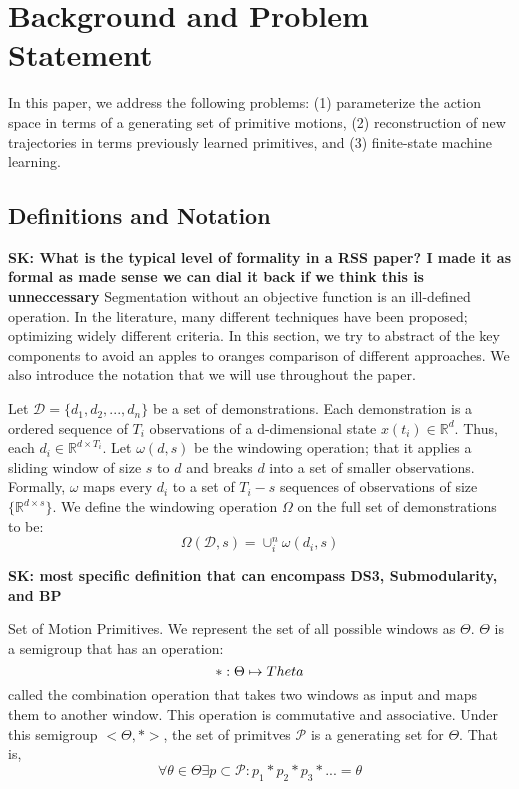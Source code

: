\section{Background and Problem Statement}
In this paper, we address the following problems: (1) parameterize the action space in terms of a generating set of primitive motions, (2) reconstruction of new trajectories in terms previously learned primitives, and (3) finite-state machine learning.
\subsection{Definitions and Notation}
\textbf{SK: What is the typical level of formality in a RSS paper? I made it as formal as made sense we can dial it back if we think this is unneccessary}
Segmentation without an objective function is an ill-defined operation. 
In the literature, many different techniques have been proposed; optimizing widely different criteria.
In this section, we try to abstract of the key components to avoid an apples to oranges comparison of different approaches.
We also introduce the notation that we will use throughout the paper.

Let $\mathcal{D}=\{d_1,d_2,...,d_n\}$ be a set of demonstrations.
Each demonstration is a ordered sequence of $T_i$ observations of a d-dimensional state $x( t_i ) \in \mathbb{R}^d $.
Thus, each $d_i\in \mathbb{R}^{d \times T_i}$.
Let $\omega(d,s)$ be the windowing operation; that it applies a sliding window  of size $s$ to $d$ and breaks $d$ into a set of smaller observations.
Formally, $\omega$ maps every $d_i$ to a set of $T_i-s$ sequences of observations of size $\{ \mathbb{R}^{d \times s} \}$.
We define the windowing operation $\Omega$ on the full set of demonstrations to be:
\[\Omega(\mathcal{D},s) = \cup_i^n \omega(d_i,s)\]

\textbf{SK: most specific definition that can encompass DS3, Submodularity, and BP}
\begin{definition} Set of Motion Primitives. 
We represent the set of all possible windows as $\Theta$.
$\Theta$ is a semigroup that has an operation:
\[*:\Theta \time \Theta \mapsto Theta \]
called the combination operation that takes two windows as input and maps them to another window.
This operation is commutative and associative.
Under this semigroup $<\Theta,*>$, the set of primitves $\mathcal{P}$ is 
a generating set for $\Theta$.
That is, \[\forall \theta \in \Theta \exists p \subset \mathcal{P}: p_1*p_2*p_3*... = \theta\]
\end{definition}

